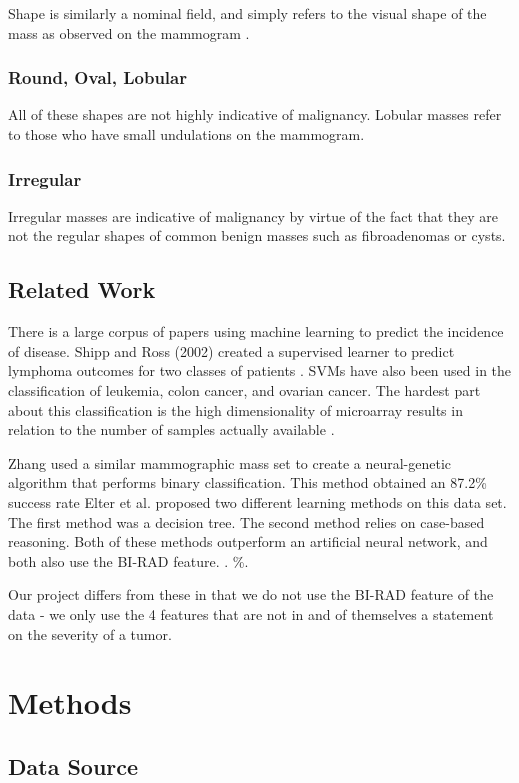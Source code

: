 \documentclass[12pt]{article}
\begin{document}
Shape is similarly a nominal field, and simply refers to the visual shape of the mass as observed on the mammogram \cite{barnes}.
\subsubsection{Round, Oval, Lobular}
All of these shapes are not highly indicative of malignancy. Lobular masses refer to those who have small undulations on the mammogram.
\subsubsection{Irregular}
Irregular masses are indicative of malignancy by virtue of the fact that they are not the regular shapes of common benign masses such as fibroadenomas or cysts.

\subsection{Related Work}

There is a large corpus of papers using machine learning to predict the incidence of disease. Shipp and Ross (2002) created a supervised learner to predict lymphoma outcomes for two classes of patients \cite{shipp}. SVMs have also been used in the classification of leukemia, colon cancer, and ovarian cancer. The hardest part about this classification is the high dimensionality of microarray results in relation to the number of samples actually available \cite{review}.

Zhang used a similar mammographic mass set to create a neural-genetic algorithm that performs binary classification. This method obtained an 87.2\% success rate \cite{zhang} Elter et al. proposed two different learning methods on this data set. The first method was a decision tree. The second method relies on case-based reasoning. Both of these methods outperform an artificial neural network, and both also use the BI-RAD feature. \cite{predictionCAD}. \%. 

Our project differs from these in that we do not use the BI-RAD feature of the data - we only use the 4 features that are not in and of themselves a statement on the severity of a tumor.

\section{Methods}

\subsection{Data Source}
\end{document}
